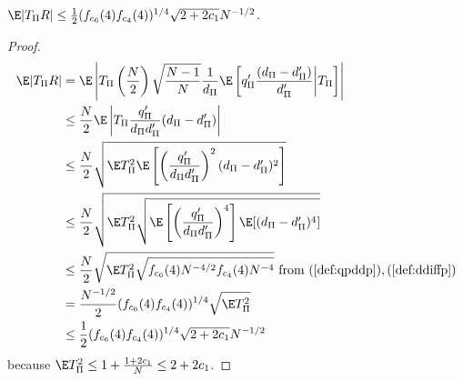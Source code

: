 \begin{proposition}
  $\E|T_{\Pi}R| \leq \frac{1}{2}(f_{c_6}(4)f_{c_4}(4))^{1/4} \sqrt{2+2c_1} N^{-1/2}$.
\end{proposition}
\begin{proof}
  \begin{align*}
    \E|T_{\Pi}R| &= \E \left | T_{\Pi} \left (\frac{N}{2}\right )
      \sqrt{\frac{N-1}{N}}\frac{1}{d_{\Pi}}\E
      \left [q_{\Pi}'\frac{(d_{\Pi}-d_{\Pi}')}{d_{\Pi}'} \middle | T_{\Pi} \right ]\right | \\
    &\leq \frac{N}{2} \E \left |T_{\Pi} \frac{q_{\Pi}'}{d_{\Pi}d_{\Pi}'}(d_{\Pi}-d_{\Pi}') \right | \\
    &\leq \frac{N}{2} \sqrt{\E T_{\Pi}^2 \E \left [ \left ( \frac{q_{\Pi}'}{d_{\Pi}d_{\Pi}'} \right )^2
        (d_{\Pi}-d_{\Pi}')^2 \right ] } \\
    &\leq \frac{N}{2} \sqrt{\E T_{\Pi}^2 \sqrt{\E \left [ \left ( \frac{q_{\Pi}'}{d_{\Pi}d_{\Pi}'} 
          \right )^4 \right ] \E[(d_{\Pi}-d_{\Pi}')^4] }} \\
    &\leq \frac{N}{2} \sqrt{\E T_{\Pi}^2 \sqrt{f_{c_6}(4) N^{-4/2} f_{c_4}(4) N^{-4}}} 
    \text{ from } (\ref{def:qpddp}), (\ref{def:ddiffp}) \\
    &=\frac{N^{-1/2}}{2}(f_{c_6}(4)f_{c_4}(4))^{1/4}\sqrt{\E T_{\Pi}^2} \\
    &\leq \frac{1}{2}(f_{c_6}(4)f_{c_4}(4))^{1/4} \sqrt{2+2c_1} N^{-1/2}
  \end{align*}
  because $\E T_{\Pi}^2 \leq 1 + \frac{1+2c_1}{N} \leq 2 + 2c_1$.
\end{proof}

